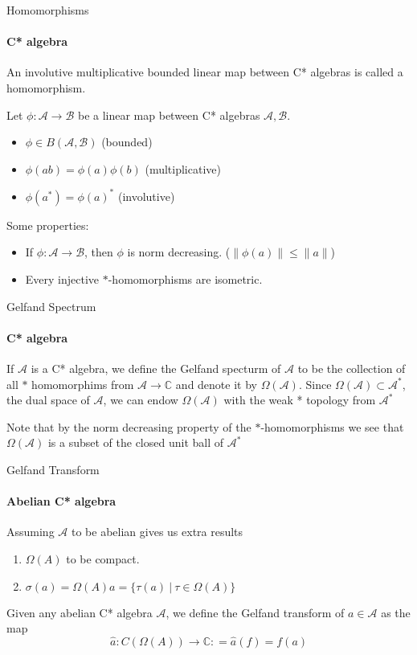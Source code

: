 \documentclass[handout, dvipsnames]{beamer}
\newcommand{\1}{\mathds{1}}	%
\begin{document}
\begin{frame}{Homomorphisms}
\framesubtitle{C* algebra}
\begin{definition}
  An involutive multiplicative bounded linear map between C* algebras is called a homomorphism. \pause

  Let $\phi: \mathcal{A \to B}$ be a linear map between C* algebras $\mathcal{A, B}$.
  \begin{itemize}
    \item $\phi \in B(\mathcal{A, B})$ (bounded)
    \item $\phi(ab) = \phi(a) \phi(b)$ (multiplicative)
    \item $\phi(a^*) = \phi(a)^*$ (involutive)
  \end{itemize}
\end{definition}
\pause

Some properties:
\begin{itemize} %
  \item If $\phi: \mathcal{A} \to \mathcal{B}$, then $\phi$ is norm decreasing. ($\|\phi(a)\| \le \|a\|$) \pause
  \item Every injective $*$-homomorphisms are isometric.
\end{itemize}
\end{frame}

\begin{frame}{Gelfand Spectrum}
\framesubtitle{C* algebra}
   \begin{definition}
     If $\mathcal{A}$ is a C* algebra, we define the Gelfand specturm of $\mathcal{A}$ to be the collection of all $*$ homomorphims from $\mathcal{A} \to \mathbb{C}$ and denote it by $\Omega(\mathcal{A})$. \pause
     Since $\Omega(\mathcal{A}) \subset \mathcal{A}^*$, the dual space of $\mathcal{A}$, we can endow $\Omega(\mathcal{A})$ with the weak * topology from $\mathcal{A}^*$
   \end{definition}
   \pause

   Note that by the norm decreasing property of the $*$-homomorphisms we see that $\Omega(\mathcal{A})$ is a subset of the closed unit ball of $\mathcal{A}^*$
\end{frame}

\begin{frame}{Gelfand Transform}
\framesubtitle{Abelian C* algebra}
  Assuming $\mathcal{A}$ to be abelian gives us extra results
  \begin{enumerate}
    \item $\Omega(A)$ to be compact. \pause
    \item $\sigma(a) = \Omega(A)a = \{\tau(a) \ | \ \tau \in \Omega(A) \}$
  \end{enumerate}
\pause

\begin{definition}
  Given any abelian C* algebra $\mathcal{A}$, we define the Gelfand transform of $a \in \mathcal{A}$ as the map $$\hat{a}: C(\Omega(A)) \to \mathbb{C}: = \hat{a}(f) = f(a)$$
\end{definition}
\end{frame}
\end{document}

